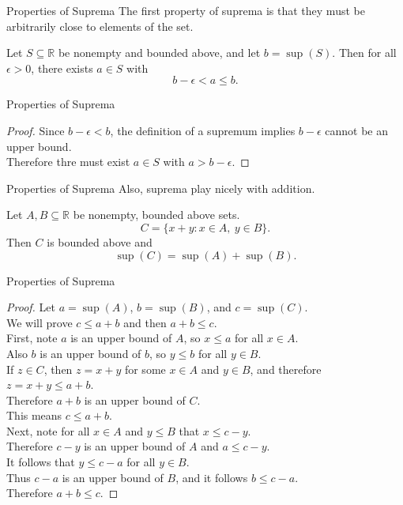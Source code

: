 \documentclass{beamer}
\begin{document}
\begin{frame}{Properties of Suprema}
The first property of suprema is that they must be arbitrarily close to elements of the set.
\begin{thm}
Let $S\subseteq\mathbb{R}$ be nonempty and bounded above, and let $b = \sup(S)$.
Then for all $\epsilon > 0$, there exists $a\in S$ with
$$b-\epsilon < a \leq b.$$
\end{thm}
\end{frame}
\begin{frame}{Properties of Suprema}
\begin{proof}
Since $b-\epsilon < b$, the definition of a supremum implies $b-\epsilon$ cannot be an upper bound.\\
\pause
Therefore thre must exist $a\in S$ with $a > b-\epsilon$.
\end{proof}
\end{frame}

\begin{frame}{Properties of Suprema}
Also, suprema play nicely with addition.
\begin{thm}
Let $A,B\subseteq\mathbb{R}$ be nonempty, bounded above sets.
$$C = \{x+y: x\in A,\ y\in B\}.$$
Then $C$ is bounded above and
$$\sup(C) = \sup(A) + \sup(B).$$
\end{thm}
\end{frame}
\begin{frame}{Properties of Suprema}
\begin{proof}
Let $a = \sup(A)$, $b = \sup(B)$, and $c=\sup(C)$. \\
\pause
We will prove $c \leq a+b$ and then $a+b\leq c$. \\
\pause
First, note $a$ is an upper bound of $A$, so $x\leq a$ for all $x\in A$. \\
\pause
Also $b$ is an upper bound of $b$, so $y\leq b$ for all $y\in B$. \\
\pause
If $z\in C$, then $z=x+y$ for some $x\in A$ and $y\in B$, and therefore $z = x+y \leq a+b$. \\
\pause
Therefore $a+b$ is an upper bound of $C$. \\
\pause
This means $c\leq a+b$. \\
\pause
Next, note for all $x\in A$ and $y\leq B$ that $x\leq c-y$. \\
\pause
Therefore $c-y$  is an upper bound of $A$ and $a\leq c-y$. \\
\pause
It follows that $y\leq c-a$ for all $y\in B$. \\
\pause
Thus $c-a$ is an upper bound of $B$, and it follows $b\leq c-a$. \\
\pause
Therefore $a+b\leq c$.
\end{proof}
\end{frame}
\end{document}
